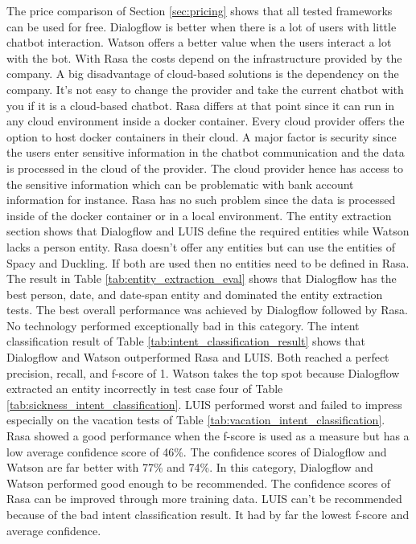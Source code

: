 The price comparison of Section \ref{sec:pricing} shows that all 
tested frameworks can be used for free.
Dialogflow is better when there is a lot of users with little chatbot interaction.
Watson offers a better value when the users interact a lot with the bot.
With Rasa the costs depend on the infrastructure provided by the company.
A big disadvantage of cloud-based solutions is the dependency on the company.
It's not easy to change the provider and take the current chatbot with you if it 
is a cloud-based chatbot. 
Rasa differs at that point since it can run in any cloud environment inside a docker container.
Every cloud provider offers the option to host docker containers in their cloud.
A major factor is security since the users enter sensitive information in the chatbot communication
and the data is processed in the cloud of the provider.
The cloud provider hence has access to the sensitive information which can be problematic with
bank account information for instance.
Rasa has no such problem since the data is processed inside of the docker container or in a 
local environment.
The entity extraction section shows that Dialogflow and LUIS 
define the required entities while Watson lacks a person entity.
Rasa doesn't offer any entities but can use the entities of 
Spacy and Duckling.
If both are used then no entities need to be defined in Rasa.
The result in Table \ref{tab:entity_extraction_eval} shows that 
Dialogflow has the best person, date, and date-span entity and dominated the 
entity extraction tests.
The best overall performance was achieved by Dialogflow followed by Rasa.
No technology performed exceptionally bad in this category.
The intent classification result of Table \ref{tab:intent_classification_result}
shows that Dialogflow and Watson outperformed Rasa and LUIS.
Both reached a perfect precision, recall, and f-score of 1.
Watson takes the top spot because Dialogflow extracted an entity incorrectly 
in test case four of Table \ref{tab:sickness_intent_classification}.
LUIS performed worst and failed to impress especially on the vacation tests
of Table \ref{tab:vacation_intent_classification}.
Rasa showed a good performance when the f-score is used as a measure but 
has a low average confidence score of 46\%.
The confidence scores of Dialogflow and Watson are far better with 77\% and 74\%.
In this category, Dialogflow and Watson performed good enough to be recommended.
The confidence scores of Rasa can be improved through more training data.
LUIS can't be recommended because of the bad intent classification result.
It had by far the lowest f-score and average confidence.


